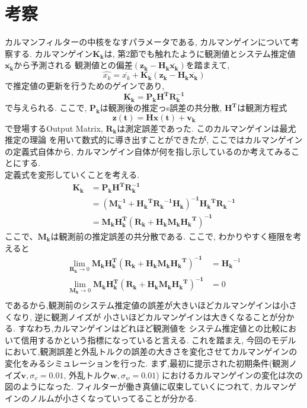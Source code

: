 \documentclass[class=article, crop=false, dvipdfmx, fleqn]{standalone}
\begin{document}
\section{考察}
カルマンフィルターの中核をなすパラメータである, カルマンゲインについて考察する.
カルマンゲイン$\bm{K_k}$は, 第2節でも触れたように観測値とシステム推定値$\bm{\overline{x_k}}$から予測される
観測値との偏差$\bm{(z_k- H_k\overline{x_k})}$を踏まえて,
\begin{equation}
  \hat{x_k} = \overline{x_k} +\bm{K_k(z_k- H_k\overline{x_k})}
\end{equation}
で推定値の更新を行うためのゲインであり,
\begin{equation}
  \bm{K_k} = \bm{P_k H^T R_k^{-1}}
\end{equation}
で与えられる. ここで, $\bm{P_k}$は観測後の推定っs誤差の共分散, $\bm{H^T}$は観測方程式
\begin{equation}
  \bm{z(t)} = \bm{Hx(t)} + \bm{v_k}
\end{equation}
で登場するOutput Matrix, $\bm{R_k}$は測定誤差であった. このカルマンゲインは最尤推定の理論
を用いて数式的に導き出すことができたが, ここではカルマンゲインの定義式自体から,
カルマンゲイン自体が何を指し示しているのか考えてみることにする. \\
定義式を変形していくことを考える.
\begin{align}
  \bm{K_k} &= \bm{P_k H^T R_k^{-1}} \nonumber \\
           &= \bm{{(M_k^{-1}+{H_k}^{T}{R_k}^{-1}H_k)}^{-1}{H_k}^T{R_k}^{-1}}\nonumber \\
           &= \bm{{M_kH_k^{T}}{(R_k + H_kM_k{H_k}^T)}^{-1}}
\end{align}
ここで、$\bm{M_k}$は観測前の推定誤差の共分散である. ここで, わかりやすく極限を考えると
\begin{align}
  \lim_{\bm{R_k} \to 0} \bm{{M_kH_k^{T}}{(R_k + H_kM_k{H_k}^T)}^{-1}} &= {\bm{H_k}}^{-1} \\
  \lim_{\bm{M_k} \to 0} \bm{{M_kH_k^{T}}{(R_k + H_kM_k{H_k}^T)}^{-1}} &= 0 \\
\end{align}
であるから,観測前のシステム推定値の誤差が大きいほどカルマンゲインは小さくなり, 逆に観測ノイズが
小さいほどカルマンゲインは大きくなることが分かる. すなわち,カルマンゲインはどれほど観測値を
システム推定値との比較において信用するかという指標になっていると言える. これを踏まえ, 今回のモデル
において,観測誤差と外乱トルクの誤差の大きさを変化させてカルマンゲインの変化をみるシミュレーションを行った.
まず,最初に提示された初期条件(観測ノイズ$\bm{v}, \sigma_v = 0.01$, 外乱トルク$\bm{w}, \sigma_w = 0.01$)
におけるカルマンゲインの変化は次の図のようになった. フィルターが働き真値に収束していくにつれて,
カルマンゲインのノルムが小さくなっていってることが分かる.
\end{document}
